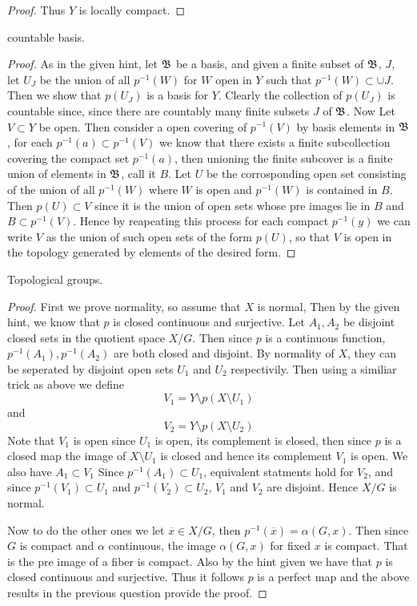 \begin{alphaparts}
\begin{proof}
            Thus $Y$ is locally compact. 
        \end{proof}


        \questionpart 
        countable basis. 
        \begin{proof}
            As in the given hint, let $\mathfrak{B}$ be a basis, and given a finite subset of $\mathfrak{B}$, $J$, let $U_J$ be the union of all $p^{-1}(W)$ for $W$ open in $Y$ such that $p^{-1}(W) \subset \cup J$. 
            Then we show that $p(U_J)$ is a basis for $Y$. Clearly the collection of $p(U_J)$ is countable since, since there are countably many finite subsets $J$ of $\mathfrak{B}$. Now Let $V \subset Y$ be open.
             Then consider a open covering of $p^{-1}(V)$ by basis elements in $\mathfrak{B}$, for each $p^{-1}(a) \subset p^{-1}(V)$ we know that there 
            exists a finite subcollection covering the compact set $p^{-1}(a)$, then unioning the finite subcover is a finite union of elements in $\mathfrak{B}$, call it $B$. Let $U$ be the corrosponding open set consisting of the union of 
            all $p^{-1}(W)$ where $W$ is open and $p^{-1}(W)$ is contained in $B$. Then $p(U) \subset V$ since it is the union of open sets whose pre images lie in $B$ and $B \subset p^{-1}(V)$. Hence by reapeating this process for each compact $p^{-1}(y)$ 
            we can write $V$ as the union of such open sets of the form $p(U)$, so that $V$ is open in the topology generated by elements of the desired form. 
        \end{proof}
    \end{alphaparts}


    \question 
    Topological groups. 

    \begin{proof}
        First we prove normality, so assume that $X$ is normal, Then by the given hint, we know that $p$ is closed continuous and surjective. Let $A_1, A_2$ be disjoint closed sets in the quotient space $X / G$. 
        Then since $p$ is a continuous function, $p^{-1}(A_1), p^{-1}(A_2)$ are both closed and disjoint. By normality of $X$, they can be seperated by disjoint open sets $U_1$ and $U_2$ respectivily. Then 
        using a similiar trick as above we define 
        \[V_1 = Y \setminus p(X \setminus U_1)\]
        and 
        \[V_2 = Y \setminus p(X \setminus U_2)\]
        Note that $V_1$ is open since $U_1$ is open, its complement is closed, then since $p$ is a closed map the image of $X \setminus U_1$ is closed and hence its complement $V_1$ is open. 
        We also have $A_1 \subset V_1$ Since $p^{-1}(A_1) \subset U_1$, equivalent statments hold for $V_2$, and since $p^{-1}(V_1) \subset U_1$ and $p^{-1}(V_2) \subset U_2$, $V_1$ and $V_2$ are disjoint. Hence $X / G $ is normal. 

        Now to do the other ones we
        let $\overline{x} \in X/G$, then $p^{-1}(\overline{x}) = \alpha(G, x)$. Then since $G$ is compact and $\alpha$ continuous, the image $\alpha(G, x)$ for fixed $x$ is compact. That is the pre image of a fiber is compact. 
         Also by the hint given we have that $p$ is closed continuous and surjective. 
        Thus it follows $p$ is a perfect map and the above results in the previous question provide the proof. 
    \end{proof}


